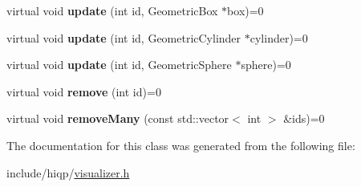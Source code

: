\begin{DoxyCompactItemize}
\item 
\hypertarget{classhiqp_1_1Visualizer_a204181a69bc76206e29900087f7b15d3}{virtual void {\bfseries update} (int id, Geometric\-Box $\ast$box)=0}\label{classhiqp_1_1Visualizer_a204181a69bc76206e29900087f7b15d3}

\item 
\hypertarget{classhiqp_1_1Visualizer_a5f77dc4be5a52e37a52a261e173e2d74}{virtual void {\bfseries update} (int id, Geometric\-Cylinder $\ast$cylinder)=0}\label{classhiqp_1_1Visualizer_a5f77dc4be5a52e37a52a261e173e2d74}

\item 
\hypertarget{classhiqp_1_1Visualizer_a261eb1f1a838c7b1d536cb5ae14b0fd1}{virtual void {\bfseries update} (int id, Geometric\-Sphere $\ast$sphere)=0}\label{classhiqp_1_1Visualizer_a261eb1f1a838c7b1d536cb5ae14b0fd1}

\item 
\hypertarget{classhiqp_1_1Visualizer_a1128e99c71c44daefb4086316347928e}{virtual void {\bfseries remove} (int id)=0}\label{classhiqp_1_1Visualizer_a1128e99c71c44daefb4086316347928e}

\item 
\hypertarget{classhiqp_1_1Visualizer_a0e6cbf0da4f9e223ce676cff9d5de8ef}{virtual void {\bfseries remove\-Many} (const std\-::vector$<$ int $>$ \&ids)=0}\label{classhiqp_1_1Visualizer_a0e6cbf0da4f9e223ce676cff9d5de8ef}

\end{DoxyCompactItemize}


The documentation for this class was generated from the following file\-:\begin{DoxyCompactItemize}
\item 
include/hiqp/\hyperlink{visualizer_8h}{visualizer.\-h}\end{DoxyCompactItemize}
